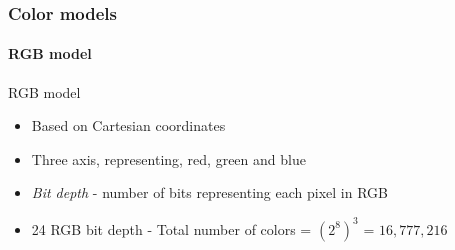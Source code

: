\documentclass{beamer}
\begin{document}
\begin{frame}
\frametitle{Color models}
\framesubtitle{RGB model}
\begin{block}{RGB model}
\footnotesize{
\begin{itemize}
\item Based on Cartesian coordinates 
\item Three axis, representing, red, green and blue
\item \textit{Bit depth} - number of bits representing each pixel in RGB 
\item 24 RGB bit depth - Total number of colors = $(2^8)^3$ = $16,777,216$
\end{itemize}
}
\begin{columns}
\end{columns}
\end{block}
\end{frame}
\end{document}
